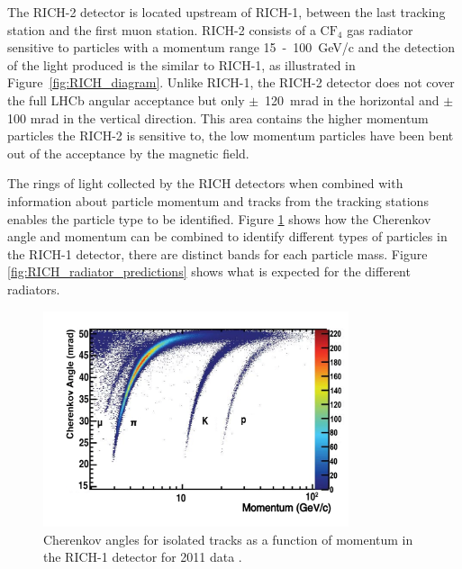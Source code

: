 The RICH-2 detector is located upstream of RICH-1, between the last tracking station and the first muon station. RICH-2 consists of a $\text{C}\text{F}_{4}$ gas radiator sensitive to particles with a momentum range 15~-~100~GeV/c and the detection of the light produced is the similar to RICH-1, as illustrated in Figure~\ref{fig:RICH_diagram}. Unlike RICH-1, the RICH-2 detector does not cover the full LHCb angular acceptance but only $\pm$~120~mrad in the horizontal and $\pm$ 100 mrad in the vertical direction. This area contains the higher momentum particles the RICH-2 is sensitive to, the low momentum particles have been bent out of the acceptance by the magnetic field. 


 
The rings of light collected by the RICH detectors when combined with information about particle momentum and tracks from the tracking stations enables the particle type to be identified. Figure \ref{fig:RICH_preformance} shows how the Cherenkov angle and momentum can be combined to identify different types of particles in the RICH-1 detector, there are distinct bands for each particle mass. Figure \ref{fig:RICH_radiator_predictions} shows what is expected for the different radiators.  


\begin{figure}[htb]
  \centering
  \includegraphics[width=0.8\textwidth]{./Figs/LHC_LHCb/hidef_Fig38.png}
  \caption{Cherenkov angles for isolated tracks as a function of momentum in the RICH-1 detector for 2011 data \cite{Adinolfi:2012qfa}.}
  \label{fig:RICH_preformance}
\end{figure}

